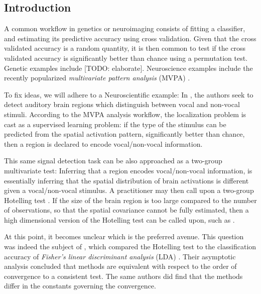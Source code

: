 \documentclass{pnastwo}
\begin{document}
\begin{article}

\begin{abstract}
[TODO]
\end{abstract}





\section{Introduction}
\label{sec:introduction}

A common workflow in genetics or neuroimaging consists of fitting a classifier, and estimating its predictive accuracy using cross validation. 
Given that the cross validated accuracy is a random quantity, it is then common to test if the cross validated accuracy is significantly better than chance using a permutation test.  
Genetic examples include [TODO: elaborate]\cite{jiang_calculating_2008,radmacher_paradigm_2002-1}.
Neuroscience examples include the recently popularized \emph{multivariate pattern analysis} (MVPA) \cite{kriegeskorte_information-based_2006,varoquaux_assessing_2016,golland_permutation_2003}.

To fix ideas, we will adhere to a Neuroscientific example: 
In \cite{gilron_quantifying_2016}, the authors seek to detect auditory brain regions which distinguish between vocal and non-vocal stimuli. 
According to the MVPA analysis workflow, the localization problem is cast as a supervised learning problem: if the type of the stimulus can be predicted from the spatial activation pattern, significantly better than chance, then a region is declared to encode vocal/non-vocal information. 

This same signal detection task can be also approached as a two-group multivariate test:
Inferring that a region encodes vocal/non-vocal information, is essentially inferring that the spatial distribution of brain activations is different given a vocal/non-vocal stimulus. 
A practitioner may then call upon a two-group Hotelling test \cite{fujikoshi_multivariate_2011}. 
If the size of the brain region is too large compared to the number of observations, so that the spatial covariance cannot be fully estimated, then a high dimensional version of the Hotelling test can be called upon, such as  \cite{srivastava_testing_2013}.

At this point, it becomes unclear which is the preferred avenue. 
This question was indeed the subject of \cite{ramdas_classification_2016}, which compared the Hotelling test to the classification accuracy of \emph{Fisher's linear discriminant analysis} (LDA) \cite{hastie_elements_2003-1}. 
Their asymptotic analysis concluded that methods are equivalent with respect to the order of convergence to a consistent test. The same authors did find that the methods differ in the constants governing the convergence.


\end{article}
\end{document}
